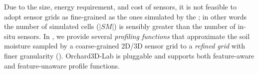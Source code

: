 Due to the size, energy requirement, and cost of sensors, it is not feasible to adopt sensor grids as fine-grained as the ones simulated by the \olab{}; in other words the number of simulated cells ($|SM|$) is sensibly greater than the number of in-situ sensors.
In
, we provide several \textit{profiling functions} that approximate the soil moisture sampled by a coarse-grained 2D/3D sensor grid to a \textit{refined grid} with finer granularity ().
Orchard3D-Lab is pluggable and supports both feature-aware and feature-unaware profile functions.



